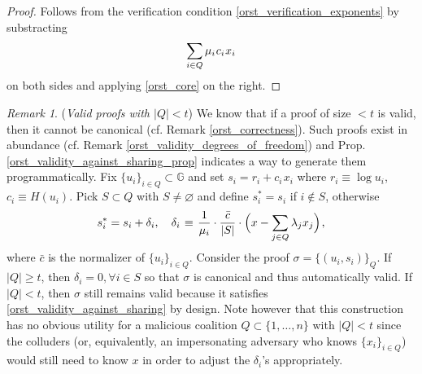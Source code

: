 \documentclass[psamsfonts, reqno]{amsart}
\theoremstyle{definition}
\theoremstyle{remark}
\newtheorem{rem}[thm]{Remark}
\numberwithin{equation}{section}
\begin{document}
\begin{proof}
Follows from the verification condition
\eqref{orst_verification_exponents}
by substracting
\vspace{5pt}
\begin{equation*}
\sum_{i \in Q} \mu_i\hspace{0.5pt}c_i\hspace{0.5pt}x_i
\vspace{5pt}
\end{equation*}
on both sides and applying \eqref{orst_core}
on the right.
\end{proof}

\begin{rem}\label{orst_valid_below_rem}
(\textit{Valid proofs with $|Q| < t$})
We know that if a proof of size $<t$ is valid,
then it cannot be canonical (cf. Remark \ref{orst_correctness}).
Such proofs exist in abundance
(cf. Remark \ref{orst_validity_degrees_of_freedom})
and Prop. \ref{orst_validity_against_sharing_prop}
indicates a way to generate them programmatically.
Fix $\{u_i\}_{i \in Q} \subset \mathbb{G}$
and set $s_i = r_i + c_i\hspace{1pt}x_i$ where
$r_i \equiv \log u_i$, $c_i \equiv H(u_i)$.
Pick $S \subset Q$ with $S \neq \varnothing$
and define
$s_i^* = s_i$ if $i \not \in S$, otherwise
\vspace{5pt}
\begin{equation*}
s_i^* = s_i + \delta_i,
\ \ \ \delta_i
	\hspace{1pt}
	\equiv
	\hspace{1pt}
	\frac{1}{\mu_i}
	\cdot
	\frac{\bar{c}}{|S|}
	\cdot
	\Big(
		x
		-
		\sum_{j \in Q} \lambda_j x_j
	\Big)
	\hspace{1pt}
	,
\vspace{5pt}
\end{equation*}
where $\bar{c}$ is the normalizer of $\{u_i\}_{i \in Q}$.
Consider the proof $\sigma = \{(u_i, s_i)\}_{Q}$.
If $|Q| \ge t$, then $\delta_i = 0,\forall i \in S$
so that $\sigma$ is canonical and thus automatically valid.
If $|Q| < t$, then $\sigma$ still remains valid because
it satisfies \eqref{orst_validity_against_sharing}
by design.
Note however that this construction has no obvious utility
for a malicious coalition $Q \subset \{1, \dots, n\}$
with $|Q| < t$ since the colluders
(or, equivalently, an impersonating adversary
who knows $\{x_i\}_{i \in Q}$)
would still need to know $x$ in order to adjust
the $\delta_i$'s appropriately.
\end{rem}
\end{document}
